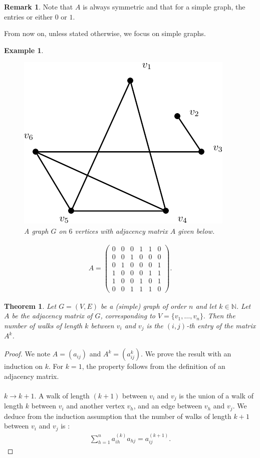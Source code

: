 \documentclass[12pt,a4paper]{article}
\newtheorem{thm}{Theorem}[section]
\newtheorem{exmp}{Example}[section]
\theoremstyle{definition}
\newtheorem{rem}{Remark}[section]
\begin{document}
\begin{rem} Note that $A$ is always symmetric and that for a simple graph, the entries or either $0$ or $1$. 
\end{rem}
From now on, unless stated otherwise, we focus on simple graphs. 
\begin{exmp} \label{exmpref} \
\begin{figure}[hbtp]
\centering
\includegraphics[scale=1]{images/graph25.pdf}
\caption{A graph $G$ on $6$ vertices with adjacency matrix $A$ given below.}
\end{figure}
\begin{align*} A=
\begin{pmatrix}
0 & 0 & 0 & 1 & 1 & 0 \\
0 & 0 & 1 & 0 & 0 & 0 \\
0 & 1 & 0 & 0 & 0 & 1 \\
1 & 0 & 0 & 0 & 1 & 1 \\
1 & 0 & 0 & 1 & 0 & 1 \\
0 & 0 & 1 & 1 & 1 & 0 
\end{pmatrix}.
\end{align*}
\end{exmp}
\begin{thm} Let $G=(V,E)$ be a (simple) graph of order $n$ and let $k \in \mathbb{N}$. Let $A$ be the adjacency matrix of $G$, corresponding to $V= \{v_1, \dots , v_n\}.$ Then the number of walks of length $k$ between $v_i$ and $v_j$ is the $(i,j)$-th entry of the matrix $A^k$. 
\end{thm}
\newpage
\begin{proof}
We note $A=(a_{ij})$ and $A^k=(a_{ij}^k)$. We prove the result with an induction on $k$. For $k=1$, the property follows from the definition of an adjacency matrix.  \\\\
$k \to k+1$. A walk of length $(k+1)$ between $v_i$ and $v_j$ is the union of a walk of length $k$ between $v_i$ and another vertex $v_h$, and an edge between $v_h$ and $v_j$. We deduce from the induction assumption that the number of walks of length $k+1$ between $v_i$ and $v_j$ is :
\begin{align*}
\sum_{h=1}^n a_{ih}^{(k)} a _{hj} = a_{ij}^{(k+1)}. 
\end{align*}
\end{proof}
\end{document}

